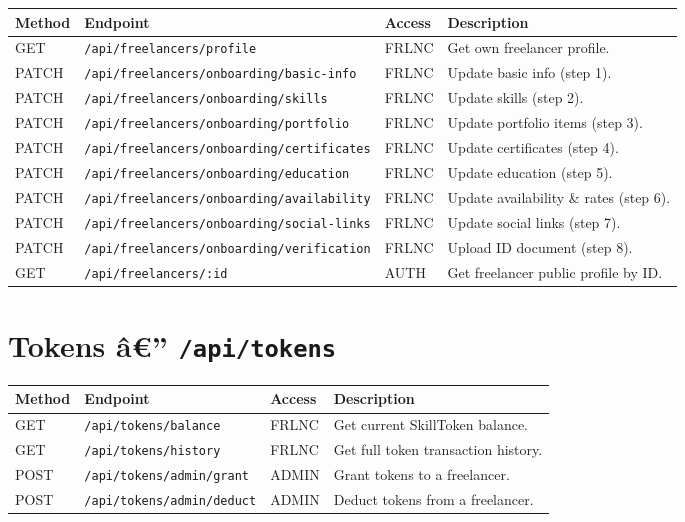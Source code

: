 \begin{longtable}{p{1.5cm} p{6.5cm} p{1.5cm} p{4.5cm}}
\toprule
\textbf{Method} & \textbf{Endpoint} & \textbf{Access} & \textbf{Description} \\
\midrule
\endhead
\bottomrule
\endfoot
GET   & \texttt{/api/freelancers/profile}                     & FRLNC  & Get own freelancer profile. \\
PATCH & \texttt{/api/freelancers/onboarding/basic-info}       & FRLNC  & Update basic info (step 1). \\
PATCH & \texttt{/api/freelancers/onboarding/skills}           & FRLNC  & Update skills (step 2). \\
PATCH & \texttt{/api/freelancers/onboarding/portfolio}        & FRLNC  & Update portfolio items (step 3). \\
PATCH & \texttt{/api/freelancers/onboarding/certificates}     & FRLNC  & Update certificates (step 4). \\
PATCH & \texttt{/api/freelancers/onboarding/education}        & FRLNC  & Update education (step 5). \\
PATCH & \texttt{/api/freelancers/onboarding/availability}     & FRLNC  & Update availability \& rates (step 6). \\
PATCH & \texttt{/api/freelancers/onboarding/social-links}     & FRLNC  & Update social links (step 7). \\
PATCH & \texttt{/api/freelancers/onboarding/verification}     & FRLNC  & Upload ID document (step 8). \\
GET   & \texttt{/api/freelancers/:id}                         & AUTH   & Get freelancer public profile by ID. \\
\end{longtable}

\section*{Tokens â€” \texttt{/api/tokens}}

\begin{longtable}{p{1.5cm} p{5.5cm} p{1.5cm} p{5.5cm}}
\toprule
\textbf{Method} & \textbf{Endpoint} & \textbf{Access} & \textbf{Description} \\
\midrule
\endhead
\bottomrule
\endfoot
GET  & \texttt{/api/tokens/balance}           & FRLNC  & Get current SkillToken balance. \\
GET  & \texttt{/api/tokens/history}           & FRLNC  & Get full token transaction history. \\
POST & \texttt{/api/tokens/admin/grant}       & ADMIN  & Grant tokens to a freelancer. \\
POST & \texttt{/api/tokens/admin/deduct}      & ADMIN  & Deduct tokens from a freelancer. \\
\end{longtable}

